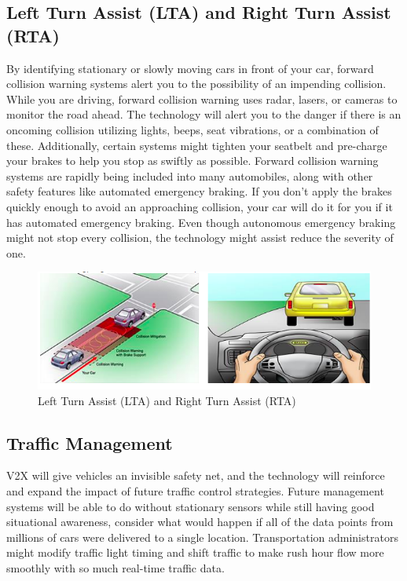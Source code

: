 \subsection{Left Turn Assist (LTA) and Right Turn Assist (RTA)}
By identifying stationary or slowly moving cars in front of your car, forward collision warning
systems alert you to the possibility of an impending collision. While you are driving, forward
collision warning uses radar, lasers, or cameras to monitor the road ahead. The technology will
alert you to the danger if there is an oncoming collision utilizing lights, beeps, seat vibrations, or
a combination of these. Additionally, certain systems might tighten your seatbelt and pre-charge
your brakes to help you stop as swiftly as possible.
Forward collision warning systems are rapidly being included into many automobiles, along with
other safety features like automated emergency braking. If you don't apply the brakes quickly
enough to avoid an approaching collision, your car will do it for you if it has automated
emergency braking. Even though autonomous emergency braking might not stop every collision,
the technology might assist reduce the severity of one.
\clearpage
\begin{figure}[h]
    \centering
    \includegraphics[scale=.5]{figure10/5.png}
    \caption{Left Turn Assist (LTA) and Right Turn Assist (RTA)}
\end{figure}

\subsection{Traffic Management}
V2X will give vehicles an invisible safety net, and the technology will reinforce and expand the
impact of future traffic control strategies. Future management systems will be able to do
without stationary sensors while still having good situational awareness, consider what would
happen if all of the data points from millions of cars were delivered to a single location.
Transportation administrators might modify traffic light timing and shift traffic to make
rush hour flow more smoothly with so much real-time traffic data.

